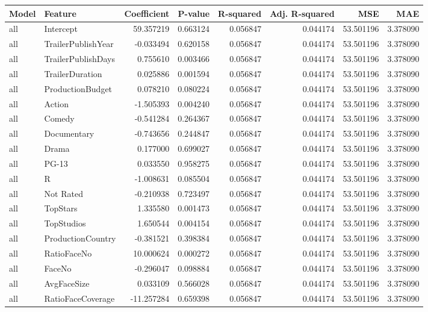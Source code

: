 \begin{tabular}{llrrrrrr}
\toprule
Model & Feature & Coefficient & P-value & R-squared & Adj. R-squared & MSE & MAE \\
\midrule
all & Intercept & 59.357219 & 0.663124 & 0.056847 & 0.044174 & 53.501196 & 3.378090 \\
all & TrailerPublishYear & -0.033494 & 0.620158 & 0.056847 & 0.044174 & 53.501196 & 3.378090 \\
all & TrailerPublishDays & 0.755610 & 0.003466 & 0.056847 & 0.044174 & 53.501196 & 3.378090 \\
all & TrailerDuration & 0.025886 & 0.001594 & 0.056847 & 0.044174 & 53.501196 & 3.378090 \\
all & ProductionBudget & 0.078210 & 0.080224 & 0.056847 & 0.044174 & 53.501196 & 3.378090 \\
all & Action & -1.505393 & 0.004240 & 0.056847 & 0.044174 & 53.501196 & 3.378090 \\
all & Comedy & -0.541284 & 0.264367 & 0.056847 & 0.044174 & 53.501196 & 3.378090 \\
all & Documentary & -0.743656 & 0.244847 & 0.056847 & 0.044174 & 53.501196 & 3.378090 \\
all & Drama & 0.177000 & 0.699027 & 0.056847 & 0.044174 & 53.501196 & 3.378090 \\
all & PG-13 & 0.033550 & 0.958275 & 0.056847 & 0.044174 & 53.501196 & 3.378090 \\
all & R & -1.008631 & 0.085504 & 0.056847 & 0.044174 & 53.501196 & 3.378090 \\
all & Not Rated & -0.210938 & 0.723497 & 0.056847 & 0.044174 & 53.501196 & 3.378090 \\
all & TopStars & 1.335580 & 0.001473 & 0.056847 & 0.044174 & 53.501196 & 3.378090 \\
all & TopStudios & 1.650544 & 0.004154 & 0.056847 & 0.044174 & 53.501196 & 3.378090 \\
all & ProductionCountry & -0.381521 & 0.398384 & 0.056847 & 0.044174 & 53.501196 & 3.378090 \\
all & RatioFaceNo & 10.000624 & 0.000272 & 0.056847 & 0.044174 & 53.501196 & 3.378090 \\
all & FaceNo & -0.296047 & 0.098884 & 0.056847 & 0.044174 & 53.501196 & 3.378090 \\
all & AvgFaceSize & 0.033109 & 0.566028 & 0.056847 & 0.044174 & 53.501196 & 3.378090 \\
all & RatioFaceCoverage & -11.257284 & 0.659398 & 0.056847 & 0.044174 & 53.501196 & 3.378090 \\

\end{tabular}
